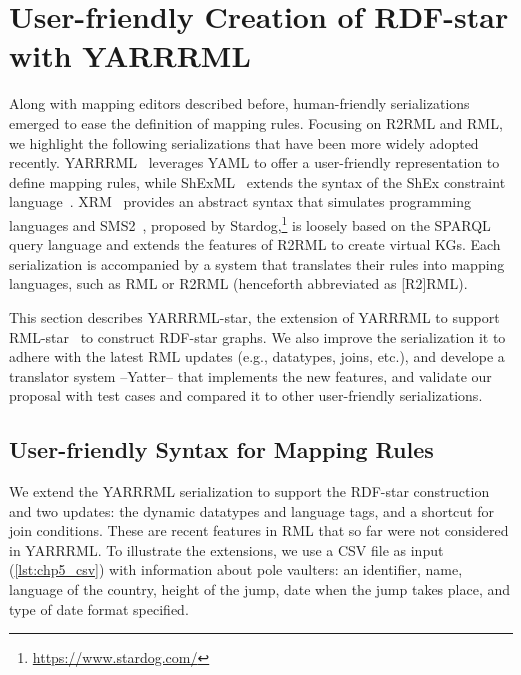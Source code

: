 \section{User-friendly Creation of RDF-star with YARRRML}
\label{sec:chp5_yarrrml_star}

Along with mapping editors described before, human-friendly serializations emerged 
to ease the definition of mapping rules. Focusing on R2RML and RML, we highlight the following serializations that have been more widely adopted recently.
YARRRML~\citep{Heyvaert2018yarrrml} leverages YAML
to offer a user-friendly representation to define mapping rules, while
ShExML~\citep{Garcia-Gonzalez2020shexml} extends the syntax of the ShEx constraint language~\citep{prud2014shex}.
XRM~\citep{xrm}
provides an abstract syntax that simulates programming languages and 
SMS2~\citep{sms2}, proposed by Stardog,\footnote{\label{foot:stardog}\url{https://www.stardog.com/}} is loosely based on the SPARQL query language and extends the features of R2RML to create virtual KGs.
Each serialization is accompanied by a system that translates their rules into mapping languages, such as RML or R2RML (henceforth abbreviated as [R2]RML). 

This section describes YARRRML-star, the extension of YARRRML to support RML-star~\citep{delva2021rml-star} to construct RDF-star graphs.
We also improve the serialization it to adhere with the latest RML updates
(e.g., datatypes, joins, etc.), and develope a translator system --Yatter-- that implements the new features, and validate our proposal with test cases and compared it to other user-friendly serializations.

\subsection{User-friendly Syntax for Mapping Rules}
\label{sec:chp5_yarrrml-desc}
We extend the YARRRML serialization to support the RDF-star construction and two updates: the dynamic datatypes and language tags, and a shortcut for join conditions. These are recent features in RML that so far were not considered in YARRRML.
To illustrate the extensions,
we use a CSV file as input (\cref{lst:chp5_csv}) with information about pole vaulters: an identifier, name, language of the country, height of the jump, date when the jump takes place, and type of date format specified.

